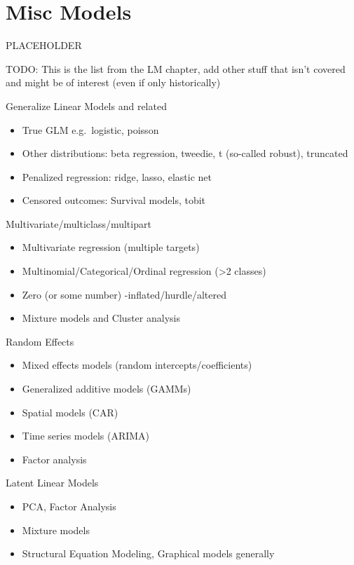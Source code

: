 \documentclass[
  letterpaper,
]{krantz}
\providecommand{\tightlist}{%
  \setlength{\itemsep}{0pt}\setlength{\parskip}{0pt}}\usepackage{longtable,booktabs,array}
\begin{document}
\chapter{Misc Models}\label{misc-models}

PLACEHOLDER

TODO: This is the list from the LM chapter, add other stuff that isn't
covered and might be of interest (even if only historically)

Generalize Linear Models and related

\begin{itemize}
\tightlist
\item
  True GLM e.g.~logistic, poisson
\item
  Other distributions: beta regression, tweedie, t (so-called robust),
  truncated
\item
  Penalized regression: ridge, lasso, elastic net
\item
  Censored outcomes: Survival models, tobit
\end{itemize}

Multivariate/multiclass/multipart

\begin{itemize}
\tightlist
\item
  Multivariate regression (multiple targets)
\item
  Multinomial/Categorical/Ordinal regression (\textgreater2 classes)
\item
  Zero (or some number) -inflated/hurdle/altered
\item
  Mixture models and Cluster analysis
\end{itemize}

Random Effects

\begin{itemize}
\tightlist
\item
  Mixed effects models (random intercepts/coefficients)
\item
  Generalized additive models (GAMMs)
\item
  Spatial models (CAR)
\item
  Time series models (ARIMA)
\item
  Factor analysis
\end{itemize}

Latent Linear Models

\begin{itemize}
\tightlist
\item
  PCA, Factor Analysis
\item
  Mixture models
\item
  Structural Equation Modeling, Graphical models generally
\end{itemize}
\end{document}
